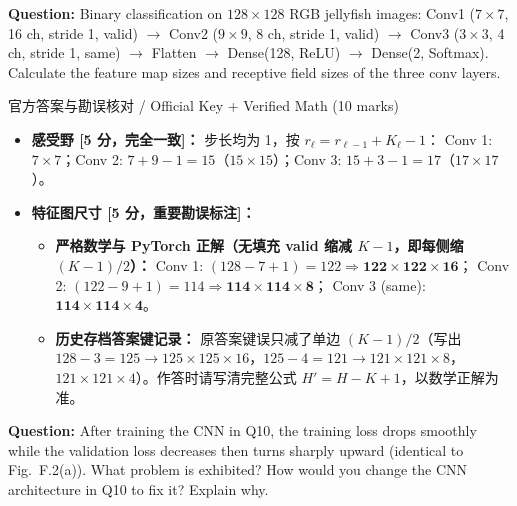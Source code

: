\textbf{Question:} Binary classification on $128\times 128$ RGB jellyfish images: Conv1 ($7\times 7$, 16 ch, stride 1, valid) $\to$ Conv2 ($9\times 9$, 8 ch, stride 1, valid) $\to$ Conv3 ($3\times 3$, 4 ch, stride 1, same) $\to$ Flatten $\to$ Dense(128, ReLU) $\to$ Dense(2, Softmax). Calculate the feature map sizes and receptive field sizes of the three conv layers.

\begin{StudySolution}{官方答案与勘误核对 / Official Key + Verified Math (10 marks)}
\begin{itemize}
\item \textbf{感受野 [5 分，完全一致]：} 步长均为 1，按 $r_\ell = r_{\ell-1} + K_\ell - 1$：
  Conv 1: $7\times 7$；Conv 2: $7 + 9 - 1 = 15$（$15\times 15$）；Conv 3: $15 + 3 - 1 = 17$（$17\times 17$）。
\item \textbf{特征图尺寸 [5 分，重要勘误标注]：}
  \begin{itemize}
  \item \textbf{严格数学与 PyTorch 正解（无填充 valid 缩减 $K-1$，即每侧缩 $(K-1)/2$）：}
    Conv 1: $(128-7+1)=122 \Rightarrow \mathbf{122\times 122\times 16}$；
    Conv 2: $(122-9+1)=114 \Rightarrow \mathbf{114\times 114\times 8}$；
    Conv 3 (same): $\mathbf{114\times 114\times 4}$。
  \item \textbf{历史存档答案键记录：} 原答案键误只减了单边 $(K-1)/2$（写出 $128-3=125\to 125\times 125\times 16$，$125-4=121\to 121\times 121\times 8$，$121\times 121\times 4$）。作答时请写清完整公式 $H'=H-K+1$，以数学正解为准。
  \end{itemize}
\end{itemize}
\end{StudySolution}

\textbf{Question:} After training the CNN in Q10, the training loss drops smoothly while the validation loss decreases then turns sharply upward (identical to Fig.~F.2(a)). What problem is exhibited? How would you change the CNN architecture in Q10 to fix it? Explain why.

